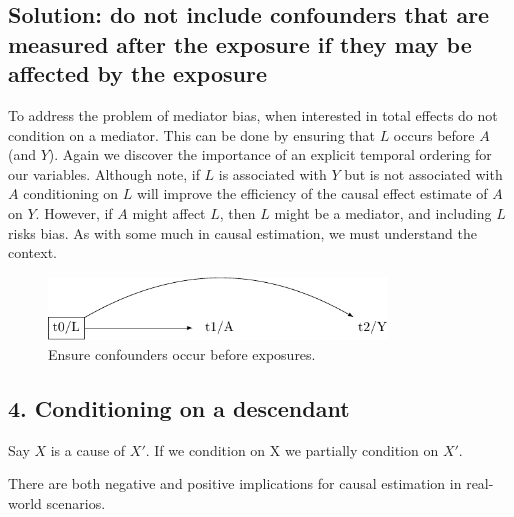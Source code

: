 \documentclass[
  singlecolumn]{report}
\begin{document}
\hypertarget{solution-do-not-include-confounders-that-are-measured-after-the-exposure-if-they-may-be-affected-by-the-exposure}{%
\subsection{Solution: do not include confounders that are measured after
the exposure if they may be affected by the
exposure}\label{solution-do-not-include-confounders-that-are-measured-after-the-exposure-if-they-may-be-affected-by-the-exposure}}

To address the problem of mediator bias, when interested in total
effects do not condition on a mediator. This can be done by ensuring
that \(L\) occurs before \(A\) (and \(Y\)). Again we discover the
importance of an explicit temporal ordering for our variables. Although
note, if \(L\) is associated with \(Y\) but is not associated with \(A\)
conditioning on \(L\) will improve the efficiency of the causal effect
estimate of \(A\) on \(Y\). However, if \(A\) might affect \(L\), then
\(L\) might be a mediator, and including \(L\) risks bias. As with some
much in causal estimation, we must understand the context.

\begin{figure}

{\centering \includegraphics[width=0.8\textwidth,height=\textheight]{causal-dags_files/figure-pdf/fig-dag-mediator-solution-1.pdf}

}

\caption{\label{fig-dag-mediator-solution}Ensure confounders occur
before exposures.}

\end{figure}

\hypertarget{conditioning-on-a-descendant}{%
\subsection{4. Conditioning on a
descendant}\label{conditioning-on-a-descendant}}

Say \(X\) is a cause of \(X\prime\). If we condition on X we partially
condition on \(X\prime\).

There are both negative and positive implications for causal estimation
in real-world scenarios.
\end{document}
